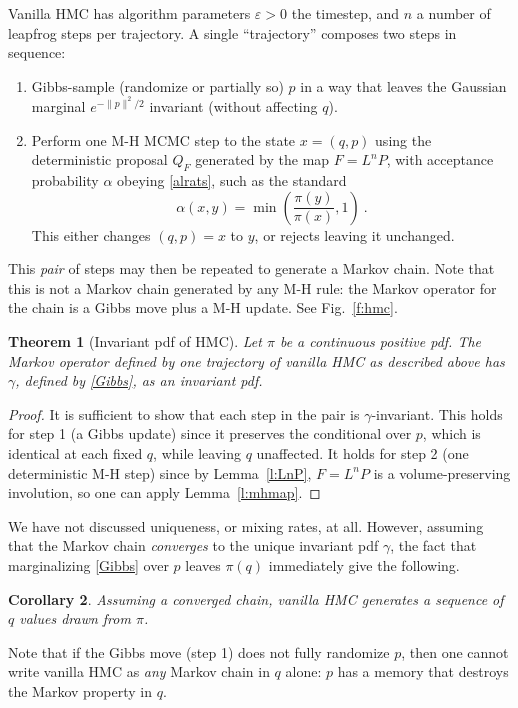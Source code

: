 \documentclass[10pt]{article}
\newcommand{\ben}{\begin{enumerate}}
\newcommand{\een}{\end{enumerate}}
\newtheorem{thm}{Theorem}
\newtheorem{cor}[thm]{Corollary}
\newcommand{\al}{\alpha}
\newcommand{\eps}{\varepsilon}
\begin{document}
Vanilla HMC has algorithm parameters $\eps>0$ the timestep, and $n$ a number of leapfrog steps per trajectory.
A single ``trajectory'' composes two steps in sequence:
\ben
\item Gibbs-sample (randomize or partially so) $p$ in a way that leaves the
  Gaussian marginal $e^{-\|p\|^2/2}$ invariant (without affecting $q$).
\item Perform one M-H MCMC step to the state $x=(q,p)$
  using the deterministic proposal $Q_F$ generated by the map $F = L^n P$,
  with acceptance probability $\al$ obeying \eqref{alrats},
  such as the standard
  $$
  \al(x,y) = \min\left(\frac{\pi(y)}{\pi(x)}, 1\right)~.
  $$
  This either changes $(q,p)=x$ to $y$, or rejects leaving it unchanged.
\een
This {\em pair} of steps may then be repeated to generate a Markov chain.
Note that this is not a Markov chain generated by any
M-H rule: the Markov operator for the chain is a Gibbs move plus a M-H update.
See Fig.~\ref{f:hmc}.

\begin{thm}[Invariant pdf of HMC]
  Let $\pi$ be a continuous positive pdf.
  The Markov operator defined by one trajectory of vanilla HMC as
  described above has $\gamma$,
  defined by \eqref{Gibbs}, as an invariant pdf.
  \label{t:hmc}
\end{thm}
\begin{proof}
  It is sufficient to show that each step in the pair is $\gamma$-invariant.
  This holds for step 1 (a Gibbs update) since it preserves the conditional
  over $p$, which is identical at each fixed $q$, while leaving $q$ unaffected.
  It holds for step 2 (one deterministic M-H step) since by
  Lemma~\ref{l:LnP}, $F=L^n P$
  is a volume-preserving involution, so one can apply Lemma~\ref{l:mhmap}.
\end{proof}

We have not discussed uniqueness, or mixing rates, at all.
However, assuming that the Markov chain {\em converges} to the
unique invariant pdf $\gamma$,
the fact that marginalizing \eqref{Gibbs} over $p$ leaves $\pi(q)$
immediately give the following.

\begin{cor}
  Assuming a converged chain,
  vanilla HMC generates a sequence of $q$ values drawn from $\pi$.
\end{cor}
Note that if the Gibbs move (step 1) does not fully randomize $p$,
then one cannot write vanilla HMC as {\em any} Markov chain in $q$ alone:
$p$ has a memory that destroys the Markov property in $q$.
\end{document}
